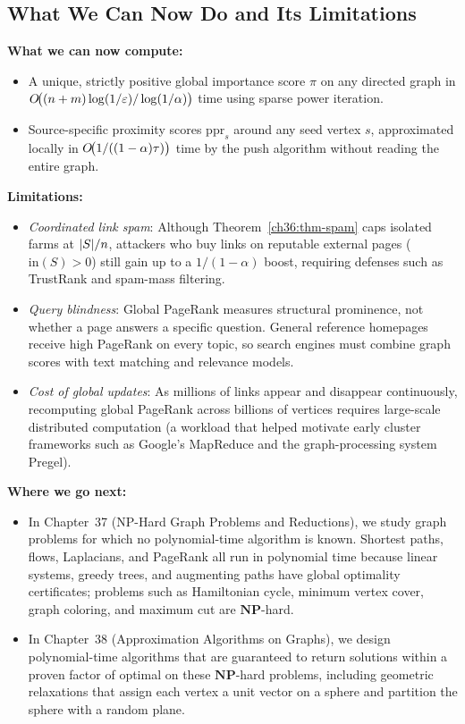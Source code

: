 \subsection{What We Can Now Do and Its Limitations}
\begin{connectionbox}
\textbf{What we can now compute:}
\begin{itemize}
  \item A unique, strictly positive global importance score $\pi$ on any directed graph in $O\!\big((n+m)\log(1/\varepsilon)/\log(1/\alpha)\big)$ time using sparse power iteration.
  \item Source-specific proximity scores $\mathrm{ppr}_s$ around any seed vertex $s$, approximated locally in $O\!\big(1/((1-\alpha)\tau)\big)$ time by the push algorithm without reading the entire graph.
\end{itemize}

\textbf{Limitations:}
\begin{itemize}
  \item \emph{Coordinated link spam}: Although Theorem~\ref{ch36:thm-spam} caps isolated farms at $\lvert S\rvert/n$, attackers who buy links on reputable external pages ($\mathrm{in}(S) > 0$) still gain up to a $1/(1-\alpha)$ boost, requiring defenses such as TrustRank and spam-mass filtering.
  \item \emph{Query blindness}: Global PageRank measures structural prominence, not whether a page answers a specific question. General reference homepages receive high PageRank on every topic, so search engines must combine graph scores with text matching and relevance models.
  \item \emph{Cost of global updates}: As millions of links appear and disappear continuously, recomputing global PageRank across billions of vertices requires large-scale distributed computation (a workload that helped motivate early cluster frameworks such as Google's MapReduce and the graph-processing system Pregel).
\end{itemize}

\textbf{Where we go next:}
\begin{itemize}
  \item In Chapter~37 (NP-Hard Graph Problems and Reductions), we study graph problems for which no polynomial-time algorithm is known. Shortest paths, flows, Laplacians, and PageRank all run in polynomial time because linear systems, greedy trees, and augmenting paths have global optimality certificates; problems such as Hamiltonian cycle, minimum vertex cover, graph coloring, and maximum cut are $\mathbf{NP}$-hard.
  \item In Chapter~38 (Approximation Algorithms on Graphs), we design polynomial-time algorithms that are guaranteed to return solutions within a proven factor of optimal on these $\mathbf{NP}$-hard problems, including geometric relaxations that assign each vertex a unit vector on a sphere and partition the sphere with a random plane.
\end{itemize}
\end{connectionbox}

